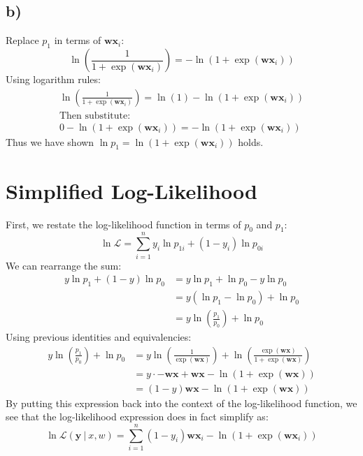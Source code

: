 \documentclass{article}
\renewcommand{\vec}[1]{%
	\mathbf{#1}%
}
\newcommand{\gv}{%
	\:|\:
}
\begin{document}
	\subsection*{b)}
	Replace $p_1$ in terms of $\vec{w}\vec{x}_i$:
	\[ \ln\left(\frac{1}{1+\exp(\vec{w}\vec{x}_i)}\right) = -\ln(1+\exp(\vec{w}\vec{x}_i)) \]
	Using logarithm rules:
	\begin{gather*} 
		\ln\left(\frac{1}{1+\exp(\vec{w}\vec{x}_i)}\right) = \ln(1) - \ln(1+\exp(\vec{w}\vec{x}_i)) \\
		\text{Then substitute:}\\
		0 - \ln(1+\exp(\vec{w}\vec{x}_i))= -\ln(1+\exp(\vec{w}\vec{x}_i))
	\end{gather*}
	Thus we have shown $\ln p_1 = \ln(1+\exp(\vec{w}\vec{x}_i))$ holds.
	
	\section{Simplified Log-Likelihood}
	First, we restate the log-likelihood function in terms of $p_0$ and $p_1$:
	\[ \ln\mathcal{L} = \sum_{i=1}^n y_i \ln p_{1i} + (1-y_i)\ln p_{0i} \]
	We can rearrange the sum:
	\begin{align*}
		y\ln p_1 + (1 - y)\ln p_0 &= y\ln p_1 + \ln p_0 - y \ln p_0\\
		&= y(\ln p_1 - \ln p_0) + \ln p_0\\
		&= y\ln\left(\frac{p_1}{p_0}\right) + \ln p_0
	\end{align*}
	Using previous identities and equivalencies:
	\begin{align*}
		y\ln\left(\frac{p_1}{p_0}\right) + \ln p_0 &=
		y \ln \left(\frac{1}{\exp(\vec{w}\vec{x})}\right) + \ln\left(\frac{\exp(\vec{w}\vec{x})}{1+\exp(\vec{w}\vec{x})}\right)\\
		&= y\cdot -\vec{w}\vec{x} + \vec{w}\vec{x} - \ln(1+\exp(\vec{w}\vec{x}))\\
		&= \boxed{(1-y)\vec{w}\vec{x} - \ln(1+\exp(\vec{w}\vec{x}))}
	\end{align*}
	By putting this expression back into the context of the log-likelihood function, we see that the log-likelihood expression does in fact simplify as:
	\[ \ln\mathcal{L}(\vec{y}\gv x,w) = \sum_{i=1}^n
		(1-y_i)\vec{w}\vec{x}_i - \ln(1 + \exp(\vec{w}\vec{x}_i)) \]
\end{document}
